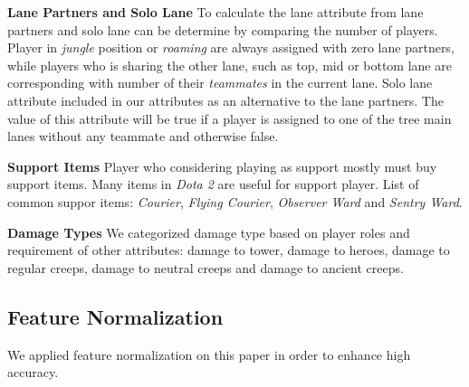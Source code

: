\textbf{Lane Partners and Solo Lane} To calculate the lane attribute from lane partners and solo lane can be determine by comparing the number of players. Player in \textit{jungle} position or \textit{roaming} are always assigned with zero lane partners, while players who is sharing the other lane, such as top, mid or bottom lane are corresponding with number of their \textit{teammates} in the current lane. Solo lane attribute included in our attributes as an alternative to the lane partners. The value of this attribute will be true if a player is assigned to one of the tree main lanes without any teammate and otherwise false.

\textbf{Support Items} Player who considering playing as support mostly must buy support items. Many items in \textit{Dota 2} are useful for support player. List of common suppor items: \textit{Courier}, \textit{Flying Courier}, \textit{Observer Ward} and \textit{Sentry Ward}. 

\textbf{Damage Types} We categorized damage type based on player roles and requirement of other attributes: damage to tower, damage to heroes, damage to regular creeps, damage to neutral creeps and damage to ancient creeps.

\subsection{Feature Normalization}
\label{sec:featurenorm}

We applied feature normalization on this paper in order to enhance high accuracy.